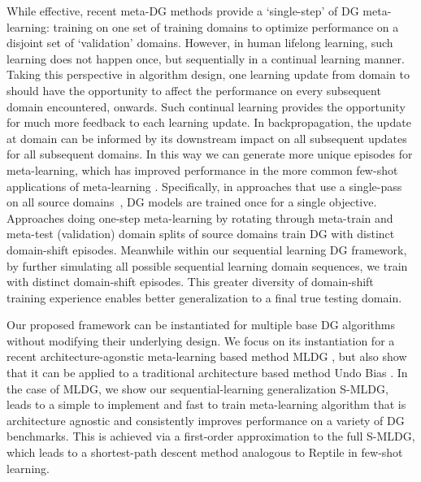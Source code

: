 \documentclass[runningheads]{llncs}
\newcommand{\nameS}{S-MLDG}
\begin{document}
While effective, recent meta-DG methods \cite{Li2018MLDG,NIPS2018_metareg} provide a `single-step' of DG meta-learning: training on one set of training domains to optimize performance on a  disjoint set of `validation' domains. However, in human lifelong learning, such learning does not happen once, but sequentially in a continual learning manner. Taking this perspective in algorithm design, one learning update from domain  to  should have the opportunity to affect the performance on every subsequent domain encountered,  onwards. Such continual learning provides the opportunity for much more feedback to each learning update. In backpropagation, the update at domain  can be informed by its downstream impact on all subsequent updates for all subsequent domains. In this way we can generate more unique episodes for meta-learning, which has improved performance in the more common few-shot applications of meta-learning \cite{vinyals2016oneShot,pmlr-v80-wei18a,lopezpaz2017GEM}. Specifically, in approaches that use a single-pass on all source domains~\cite{ECCV12_Khosla,motiian2017CCSA,ganin2016dann}, DG models are trained once for a single objective. Approaches doing one-step meta-learning  \cite{Li2018MLDG,NIPS2018_metareg} by rotating through meta-train and meta-test (validation) domain splits of  source domains train DG with  distinct domain-shift episodes. Meanwhile within our sequential learning DG framework, by further simulating all possible sequential learning domain sequences, we train with  distinct domain-shift episodes. This greater diversity of domain-shift training experience enables better generalization to a final true testing domain. 

Our proposed framework can be instantiated for multiple base DG algorithms without modifying their underlying design. We focus on its instantiation for a recent architecture-agonstic meta-learning based method MLDG \cite{Li2018MLDG}, but also show that it can be applied to a  traditional architecture based method Undo Bias \cite{ECCV12_Khosla}. In the case of MLDG, we show  our sequential-learning generalization \nameS{}, leads to a simple to implement and fast to train meta-learning algorithm that is architecture agnostic and consistently improves performance on a variety of DG benchmarks. This is achieved via a first-order approximation to the full \nameS{}, which leads to a shortest-path descent method analogous to Reptile \cite{DBLP:journals/corr/abs-1803-02999} in few-shot learning.
\end{document}
